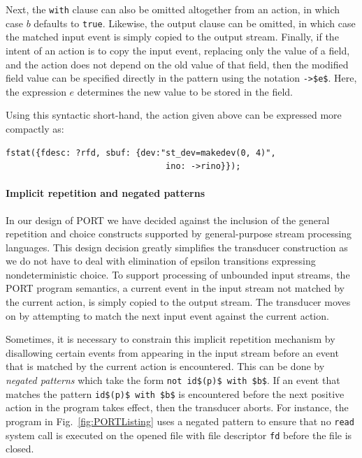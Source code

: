 Next, the \lstinline+with+ clause can also be omitted altogether from an action, in which case $b$ defaults to \lstinline+true+. Likewise, the output clause can be omitted, in which case the matched input event is simply copied to the output stream. Finally, if the intent of an action is to copy the input event, replacing only the value of a field, and the action does not depend on the old value of that field, then the modified field value can be specified directly in the pattern using the notation \lstinline+->$e$+. Here, the expression $e$ determines the new value to be stored in the field.

Using this syntactic short-hand, the action given above can be expressed more compactly as:
\begin{lstlisting}[numbers=none,xleftmargin=0em,gobble=2]
  fstat({fdesc: ?rfd, sbuf: {dev:"st_dev=makedev(0, 4)",
                                ino: ->rino}});
\end{lstlisting}


\paragraph*{Implicit repetition and negated patterns}
In our design of PORT we have decided against the inclusion of the general repetition and choice constructs supported by general-purpose stream processing languages. This design decision greatly simplifies the transducer construction as we do not have to deal with elimination of epsilon transitions expressing nondeterministic choice. To support processing of unbounded input streams, the PORT program semantics, a current event in the input stream not matched by the current action, is simply copied to the output stream. The transducer moves on by attempting to match the next input event against the current action.

Sometimes, it is necessary to constrain this implicit repetition mechanism by disallowing certain events from appearing in the input stream before an event that is matched by the current action is encountered. This can be done by \emph{negated patterns} which take the form \lstinline+not id$(p)$ with $b$+. If an event that matches the pattern \lstinline+id$(p)$ with $b$+ is encountered before the next positive action in the program takes effect, then the transducer aborts. For instance, the program in Fig.~\ref{fig:PORTListing} uses a negated pattern to ensure that no \lstinline+read+ system call is executed on the opened file with file descriptor \lstinline+fd+ before the file is closed.

